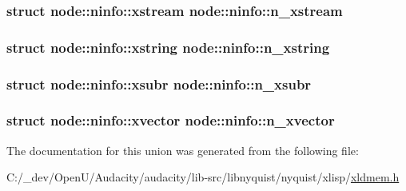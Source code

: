 \subsubsection[{\texorpdfstring{n\+\_\+xstream}{n_xstream}}]{\setlength{\rightskip}{0pt plus 5cm}struct {\bf node\+::ninfo\+::xstream}  node\+::ninfo\+::n\+\_\+xstream}\hypertarget{unionnode_1_1ninfo_a49d570518da3aac9391a0a2774cd3cc5}{}\label{unionnode_1_1ninfo_a49d570518da3aac9391a0a2774cd3cc5}
\subsubsection[{\texorpdfstring{n\+\_\+xstring}{n_xstring}}]{\setlength{\rightskip}{0pt plus 5cm}struct {\bf node\+::ninfo\+::xstring}  node\+::ninfo\+::n\+\_\+xstring}\hypertarget{unionnode_1_1ninfo_a00041541f3e8a24540bd3458251ad664}{}\label{unionnode_1_1ninfo_a00041541f3e8a24540bd3458251ad664}
\subsubsection[{\texorpdfstring{n\+\_\+xsubr}{n_xsubr}}]{\setlength{\rightskip}{0pt plus 5cm}struct {\bf node\+::ninfo\+::xsubr}  node\+::ninfo\+::n\+\_\+xsubr}\hypertarget{unionnode_1_1ninfo_a50b45dbe48fd9a60cd10bad312710862}{}\label{unionnode_1_1ninfo_a50b45dbe48fd9a60cd10bad312710862}
\subsubsection[{\texorpdfstring{n\+\_\+xvector}{n_xvector}}]{\setlength{\rightskip}{0pt plus 5cm}struct {\bf node\+::ninfo\+::xvector}  node\+::ninfo\+::n\+\_\+xvector}\hypertarget{unionnode_1_1ninfo_aa45e8492566bb0b3ca628c567da4a309}{}\label{unionnode_1_1ninfo_aa45e8492566bb0b3ca628c567da4a309}


The documentation for this union was generated from the following file\+:\begin{DoxyCompactItemize}
\item 
C\+:/\+\_\+dev/\+Open\+U/\+Audacity/audacity/lib-\/src/libnyquist/nyquist/xlisp/\hyperlink{xldmem_8h}{xldmem.\+h}\end{DoxyCompactItemize}
